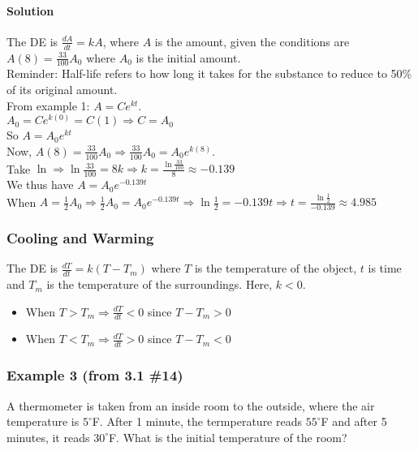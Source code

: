 \documentclass{article}
\newcommand{\dg}{^{\circ}}
\begin{document}
\paragraph{Solution} The DE is $\frac{dA}{dt}=kA$, where $A$ is the amount, given the conditions are $A(8)=\frac{33}{100}A_0$ where $A_0$ is the initial amount.
\\Reminder: Half-life refers to how long it takes for the substance to reduce to 50\% of its original amount.
\\From example 1: $A=Ce^{kt}$.
\\$A_0=Ce^{k(0)}=C(1)\Rightarrow C=A_0$
\\So $A=A_0e^{kt}$
\\Now, $A(8)=\frac{33}{100}A_0\Rightarrow\frac{33}{100}A_0=A_0e^{k(8)}$.
\\Take $\ln\Rightarrow\ln\frac{33}{100}=8k\Rightarrow k=\frac{\ln\frac{33}{100}}{8}\approx-0.139$
\\We thus have $A=A_0e^{-0.139t}$
\\When $A=\frac{1}{2}A_0\Rightarrow\frac{1}{2}A_0=A_0e^{-0.139t}\Rightarrow\ln\frac{1}{2}=-0.139t\Rightarrow t=\frac{\ln\frac{1}{2}}{-0.139}\approx4.985$

\newpage\subsubsection{Cooling and Warming} The DE is $\frac{dT}{dt}=k(T-T_m)$ where $T$ is the temperature of the object,
$t$ is time and $T_m$ is the temperature of the surroundings. Here, $k<0$.
\begin{itemize}
    \itemsep 0em
    \item When $T>T_m\Rightarrow\frac{dT}{dt}<0$ since $T-T_m>0$
    \item When $T<T_m\Rightarrow\frac{dT}{dt}>0$ since $T-T_m<0$
\end{itemize}

\subsubsection{Example 3 (from 3.1 \#14)}
A thermometer is taken from an inside room to the outside, where the air temperature is $5\dg$F.
After 1 minute, the termperature reads $55\dg$F and after 5 minutes, it reads $30\dg$F.
What is the initial temperature of the room?
\end{document}
